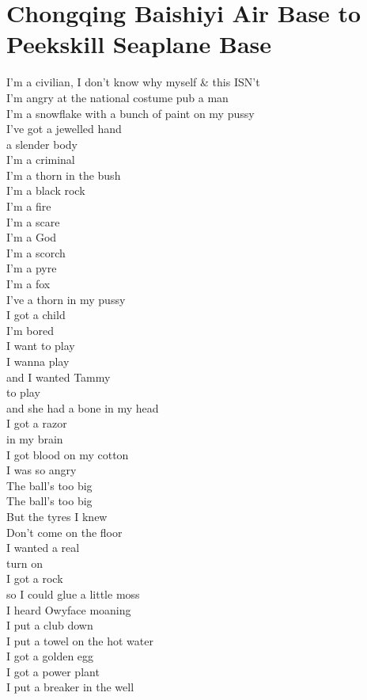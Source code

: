 \documentclass[smalldemyvopaper,11pt,twoside,onecolumn,openright,extrafontsizes]{memoir}
\begin{document}
\chapter{Chongqing Baishiyi Air Base to Peekskill Seaplane Base}
I'm a civilian, I don't know why myself \& this ISN't
\\I'm angry at the national costume pub a man
\\I'm a snowflake with a bunch of paint on my pussy
\\I've got a jewelled hand
\\a slender body
\\I'm a criminal
\\I'm a thorn in the bush
\\I'm a black rock
\\I'm a fire
\\I'm a scare
\\I'm a God
\\I'm a scorch
\\I'm a pyre
\\I'm a fox
\\I've a thorn in my pussy
\\I got a child
\\I'm bored
\\I want to play
\\I wanna play
\\and I wanted Tammy
\\to play
\\and she had a bone in my head
\\I got a razor
\\in my brain
\\I got blood on my cotton
\\I was so angry
\\The ball's too big
\\The ball's too big
\\But the tyres I knew
\\Don't come on the floor
\\I wanted a real
\\turn on
\\I got a rock
\\so I could glue a little moss
\\I heard Owyface moaning
\\I put a club down
\\I put a towel on the hot water
\\I got a golden egg
\\I got a power plant
\\I put a breaker in the well
\end{document}
